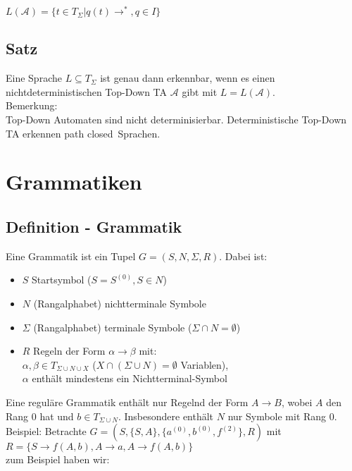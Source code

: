 \documentclass[titlepage]{article}
\begin{document}
$L(\mathcal{A}) = \{t \in T_\Sigma | q(t) \to^\ast, q \in I\}$\\

\subsection{Satz}

Eine Sprache $L \subseteq T_\Sigma$ ist genau dann erkennbar, wenn es einen nichtdeterministischen
Top-Down TA $\mathcal{A}$ gibt mit $L = L(\mathcal{A})$.\\

Bemerkung: \\
Top-Down Automaten sind nicht determinisierbar. Deterministische Top-Down TA erkennen 
\glqq path closed\grqq \ Sprachen.\\

\section{Grammatiken}

\subsection{Definition - Grammatik}

Eine Grammatik ist ein Tupel $G = (S, N, \Sigma, R)$. Dabei ist:

\begin{itemize}
    \item $S$ Startsymbol ($S = S^{(0)}, S \in N$)
    \item $N$ (Rangalphabet) nichtterminale Symbole
    \item $\Sigma$ (Rangalphabet) terminale Symbole ($\Sigma \cap N = \emptyset$)
    \item $R$ Regeln der Form $\alpha \to \beta$ mit:\\
        $\alpha, \beta \in T_{\Sigma \cup N \cup X}$ ($X \cap (\Sigma \cup N) = \emptyset$ Variablen),\\
        $\alpha$ enth\"alt mindestens ein Nichtterminal-Symbol
\end{itemize}

Eine regul\"are Grammatik enth\"alt nur Regelnd der Form
$A \to B$, wobei $A$ den Rang $0$ hat und $b \in T_{\Sigma \cup N}$.
Insbesondere enth\"alt $N$ nur Symbole mit Rang $0$.\\

Beispiel: Betrachte $G = (S, \{S, A\},\{a^{(0)}, b^{(0)}, f^{(2)}\},R)$ mit\\
$R = \{S \to f(A, b), A \to a, A \to f(A, b)\}$\\
zum Beispiel haben wir:\\
\end{document}
